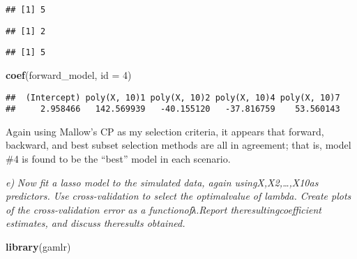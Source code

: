\documentclass[
]{article}
\newenvironment{Shaded}{\begin{snugshade}}{\end{snugshade}}
\newcommand{\DataTypeTok}[1]{\textcolor[rgb]{0.13,0.29,0.53}{#1}}
\newcommand{\DecValTok}[1]{\textcolor[rgb]{0.00,0.00,0.81}{#1}}
\newcommand{\KeywordTok}[1]{\textcolor[rgb]{0.13,0.29,0.53}{\textbf{#1}}}
\newcommand{\NormalTok}[1]{#1}
\newcommand{\OperatorTok}[1]{\textcolor[rgb]{0.81,0.36,0.00}{\textbf{#1}}}
\begin{document}
\begin{verbatim}
## [1] 5
\end{verbatim}

\begin{Shaded}
\end{Shaded}

\begin{verbatim}
## [1] 2
\end{verbatim}

\begin{Shaded}
\end{Shaded}

\begin{verbatim}
## [1] 5
\end{verbatim}

\begin{Shaded}
\begin{Highlighting}[]
\KeywordTok{coef}\NormalTok{(forward_model, }\DataTypeTok{id =} \DecValTok{4}\NormalTok{)}
\end{Highlighting}
\end{Shaded}

\begin{verbatim}
##  (Intercept) poly(X, 10)1 poly(X, 10)2 poly(X, 10)4 poly(X, 10)7 
##     2.958466   142.569939   -40.155120   -37.816759    53.560143
\end{verbatim}

Again using Mallow's CP as my selection criteria, it appears that
forward, backward, and best subset selection methods are all in
agreement; that is, model \#4 is found to be the ``best'' model in each
scenario.

\emph{e)} \emph{Now fit a lasso model to the simulated data, again
usingX,X2,\ldots,X10as predictors. Use cross-validation to select the
optimalvalue of lambda. Create plots of the cross-validation error as a
functionofλ.Report theresultingcoefficient estimates, and discuss
theresults obtained.}

\begin{Shaded}
\begin{Highlighting}[]
\KeywordTok{library}\NormalTok{(gamlr)}
\end{Highlighting}
\end{Shaded}
\end{document}
